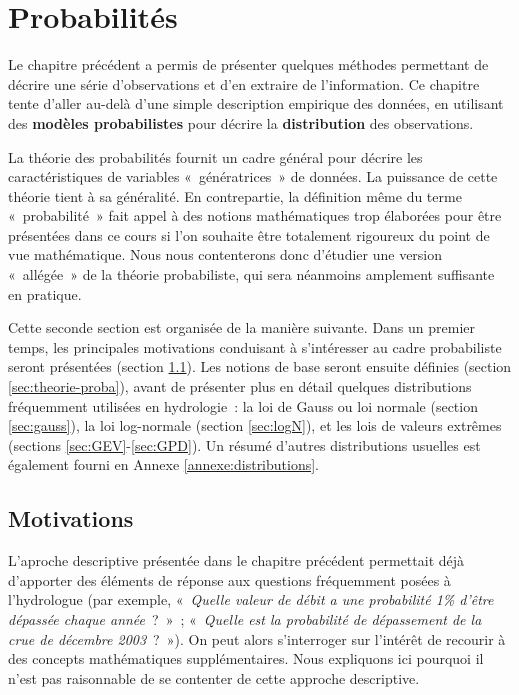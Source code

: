 \documentclass[
]{book}
\begin{document}
\chapter{Probabilités}\label{probabilituxe9s}

Le chapitre précédent a permis de présenter quelques méthodes permettant de décrire une série d'observations et d'en extraire de l'information. Ce chapitre tente d'aller au-delà d'une simple description empirique des données, en utilisant des \textbf{modèles probabilistes} pour décrire la \textbf{distribution} des observations.

La théorie des probabilités fournit un cadre général pour décrire les caractéristiques de variables «~génératrices~» de données. La puissance de cette théorie tient à sa généralité. En contrepartie, la définition même du terme «~probabilité~» fait appel à des notions mathématiques trop élaborées pour être présentées dans ce cours si l'on souhaite être totalement rigoureux du point de vue mathématique. Nous nous contenterons donc d'étudier une version «~allégée~» de la théorie probabiliste, qui sera néanmoins amplement suffisante en pratique.

Cette seconde section est organisée de la manière suivante. Dans un premier temps, les principales motivations conduisant à s'intéresser au cadre probabiliste seront présentées (section \ref{motivations}). Les notions de base seront ensuite définies (section \ref{sec:theorie-proba}), avant de présenter plus en détail quelques distributions fréquemment utilisées en hydrologie~: la loi de Gauss ou loi normale (section \ref{sec:gauss}), la loi log-normale (section \ref{sec:logN}), et les lois de valeurs extrêmes (sections \ref{sec:GEV}-\ref{sec:GPD}). Un résumé d'autres distributions usuelles est également fourni en Annexe \ref{annexe:distributions}.

\section{Motivations}\label{motivations}

L'aproche descriptive présentée dans le chapitre précédent permettait déjà d'apporter des éléments de réponse aux questions fréquemment posées à l'hydrologue (par exemple, «~\emph{Quelle valeur de débit a une probabilité 1\% d'être dépassée chaque année}~?~»~; «~\emph{Quelle est la probabilité de dépassement de la crue de décembre 2003}~?~»). On peut alors s'interroger sur l'intérêt de recourir à des concepts mathématiques supplémentaires. Nous expliquons ici pourquoi il n'est pas raisonnable de se contenter de cette approche descriptive.
\end{document}
